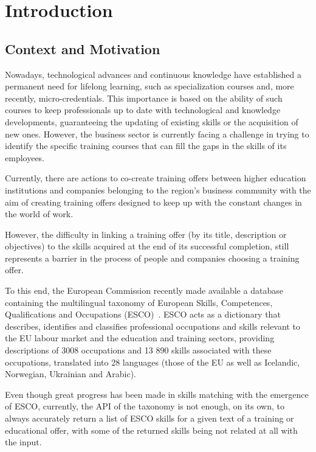 \chapter{Introduction}
\label{chapter:introduction}

\section{Context and Motivation}

Nowadays, technological advances and continuous knowledge have established a permanent need for lifelong learning, such as specialization courses and, more recently, micro-credentials. This importance is based on the ability of such courses to keep professionals up to date with technological and knowledge developments, guaranteeing the updating of existing skills or the acquisition of new ones. However, the business sector is currently facing a challenge in trying to identify the specific training courses that can fill the gaps in the skills of its employees.

Currently, there are actions to co-create training offers between higher education institutions and companies belonging to the region's business community with the aim of creating training offers designed to keep up with the constant changes in the world of work.

However, the difficulty in linking a training offer (by its title, description or objectives) to the skills acquired at the end of its successful completion, still represents a barrier in the process of people and companies choosing a training offer.

To this end, the European Commission recently made available a database containing the multilingual taxonomy of European Skills, Competences, Qualifications and Occupations (ESCO)~\cite{what_esco}.
ESCO acts as a dictionary that describes, identifies and classifies professional occupations and skills relevant to the EU labour market and the education and training sectors, providing descriptions of 3008 occupations and 13 890 skills associated with these occupations, translated into 28 languages (those of the EU as well as Icelandic, Norwegian, Ukrainian and Arabic).

Even though great progress has been made in skills matching with the emergence of ESCO, currently, the API of the taxonomy is not enough, on its own, to always accurately return a list of ESCO skills for a given text of a training or educational offer, with some of the returned skills being not related at all with the input.

